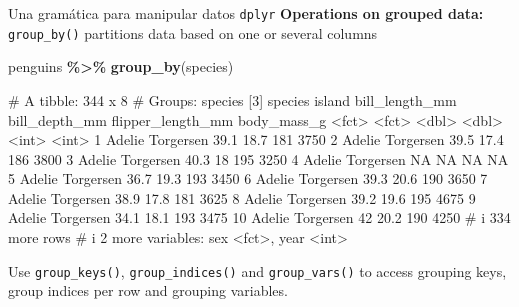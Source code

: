 \documentclass[
  ignorenonframetext,
  aspectratio=169]{beamer}
\newenvironment{Shaded}{\begin{snugshade}}{\end{snugshade}}
\newcommand{\FunctionTok}[1]{\textcolor[rgb]{0.13,0.29,0.53}{\textbf{#1}}}
\newcommand{\NormalTok}[1]{#1}
\newcommand{\SpecialCharTok}[1]{\textcolor[rgb]{0.81,0.36,0.00}{\textbf{#1}}}
\let\oldverbatim\verbatim
\let\endoldverbatim\endverbatim
\renewenvironment{verbatim}{\tiny\oldverbatim}{\endoldverbatim}
\begin{document}
\begin{frame}[fragile]{Una gramática para manipular datos
\texttt{dplyr}}
\label{una-gramuxe1tica-para-manipular-datos-dplyr-4}
\textbf{Operations on grouped data:} \texttt{group\_by()} partitions
data based on one or several columns

\begin{Shaded}
\begin{Highlighting}[]
\NormalTok{penguins }\SpecialCharTok{\%\textgreater{}\%} \FunctionTok{group\_by}\NormalTok{(species)}
\end{Highlighting}
\end{Shaded}

\begin{verbatim}
# A tibble: 344 x 8
# Groups:   species [3]
   species island    bill_length_mm bill_depth_mm flipper_length_mm body_mass_g
   <fct>   <fct>              <dbl>         <dbl>             <int>       <int>
 1 Adelie  Torgersen           39.1          18.7               181        3750
 2 Adelie  Torgersen           39.5          17.4               186        3800
 3 Adelie  Torgersen           40.3          18                 195        3250
 4 Adelie  Torgersen           NA            NA                  NA          NA
 5 Adelie  Torgersen           36.7          19.3               193        3450
 6 Adelie  Torgersen           39.3          20.6               190        3650
 7 Adelie  Torgersen           38.9          17.8               181        3625
 8 Adelie  Torgersen           39.2          19.6               195        4675
 9 Adelie  Torgersen           34.1          18.1               193        3475
10 Adelie  Torgersen           42            20.2               190        4250
# i 334 more rows
# i 2 more variables: sex <fct>, year <int>
\end{verbatim}

Use \texttt{group\_keys()}, \texttt{group\_indices()} and
\texttt{group\_vars()} to access grouping keys, group indices per row
and grouping variables.
\end{frame}
\end{document}
